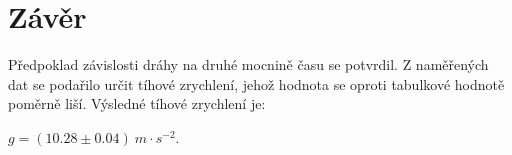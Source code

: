 
\section{Závěr}
Předpoklad závislosti dráhy na druhé mocnině času se potvrdil. Z naměřených dat se podařilo určit tíhové zrychlení, jehož hodnota se oproti tabulkové hodnotě poměrně liší.
Výsledné tíhové zrychlení je: \newline 
\begin{center}
	\begin{large}
		$g = (10.28\pm 0.04) ~m\cdot s^{-2}$.
	\end{large}
	
\end{center}





